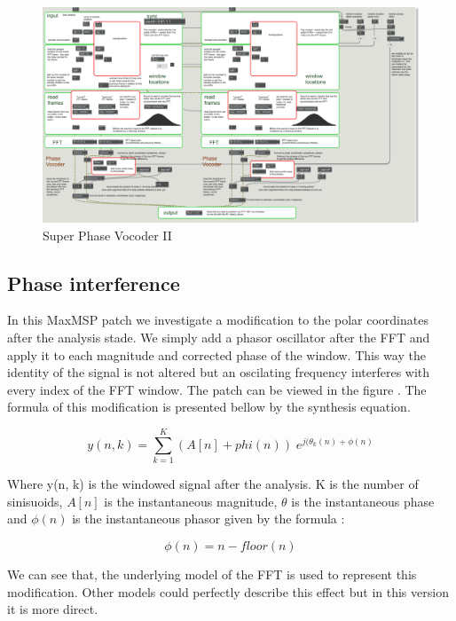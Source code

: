 	\begin{figure}
        \centering
        \includegraphics[width = \textwidth]{Graphs/SuperPhaseVoc.png}
        \caption{Super Phase Vocoder II}
        \label{SuperPhaseVoc}
    \end{figure}

\subsection{Phase interference}
    In this MaxMSP patch we investigate a modification to the polar coordinates after the analysis stade. We simply add a phasor oscillator after the FFT and apply it to each magnitude and corrected phase of the window. This way the identity of the signal is not altered but an oscilating frequency interferes with every index of the FFT window. The patch can be viewed in the figure . The formula of this modification is presented bellow by the synthesis equation.

    \begin{equation}
      y(n, k) = \sum_{k=1}^K (A[n]+phi(n)) \; e^{j (\theta_k(n) +\phi(n)}
    \end{equation}
    
    Where y(n, k) is the windowed signal after the analysis. K is the number of sinisuoids, $A[n]$ is the instantaneous magnitude, $\theta$ is the instantaneous phase and $\phi(n)$ is the instantaneous phasor given by the formula :

    \begin{equation*}
        \phi(n) = n - floor(n)
    \end{equation*}

    We can see that, the underlying model of the FFT is used to represent this modification. Other models could perfectly describe this effect but in this version it is more direct.


